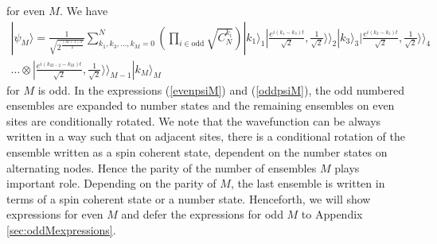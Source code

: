 \documentclass{WileyMSP-template}
\begin{document}
%
%
for even $ M $. We have
%
\begin{multline}
| \psi_M \rangle=\frac{1}{\sqrt{2^{\frac{(M+1)N}{2}}}}\sum_{k_1,k_3,\ldots,k_M=0}^{N}\left( \prod_{i \in \text{odd}} \sqrt{ C^{k_i}_{N}}  \right) %
| k_1 \rangle_1  |\frac{e^{i(k_{1} - k_{3})t}}{\sqrt{2}},\frac{1}{\sqrt{2}}\rangle\rangle_2 | k_3 \rangle_3
|\frac{e^{i(k_{3} - k_{5})t}}{\sqrt{2}},\frac{1}{\sqrt{2}}\rangle\rangle_4  \\
\dots \otimes |\frac{e^{i(k_{M-2} - k_{M})t}}{\sqrt{2}},\frac{1}{\sqrt{2}}\rangle\rangle_{M-1} | k_{M} \rangle_{M}
\label{oddpsiM}
\end{multline}
%
%
%
for $M$ is odd.  In the expressions (\ref{evenpsiM}) and (\ref{oddpsiM}), the odd numbered ensembles are expanded to number states and the remaining ensembles on even sites are conditionally rotated. We note that the wavefunction can be always written in a way such that on adjacent sites, there is a conditional rotation of the ensemble written as a spin coherent state, dependent on the number states on alternating nodes.  Hence the parity of the number of ensembles $ M $ plays important role.  Depending on the parity of $ M $, the last ensemble is written in terms of a spin coherent state or a number state.  Henceforth, we will show expressions for even $ M $ and defer the expressions for odd $ M $ to Appendix \ref{sec:oddMexpressions}.
\end{document}
